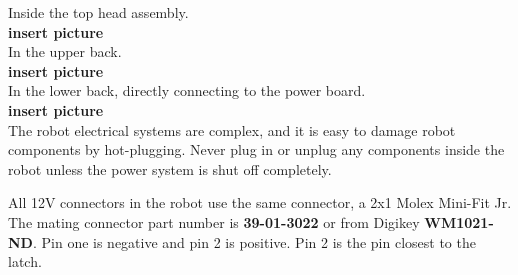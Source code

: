 Inside the top head assembly.\\

{\bf insert picture}\\


In the upper back.\\

{\bf insert picture}\\


In the lower back, directly connecting to the power board.\\

{\bf insert picture}\\

The robot electrical systems are complex, and it is easy to damage robot components
by hot-plugging.  Never plug in or unplug any components inside the robot unless
the power system is shut off completely.

All 12V connectors in the robot use the same connector, a 2x1 Molex Mini-Fit
Jr. The mating connector part number is {\bf 39-01-3022} or from Digikey {\bf
  WM1021-ND}. Pin one is negative and pin 2 is positive. Pin 2 is the pin
closest to the latch.


